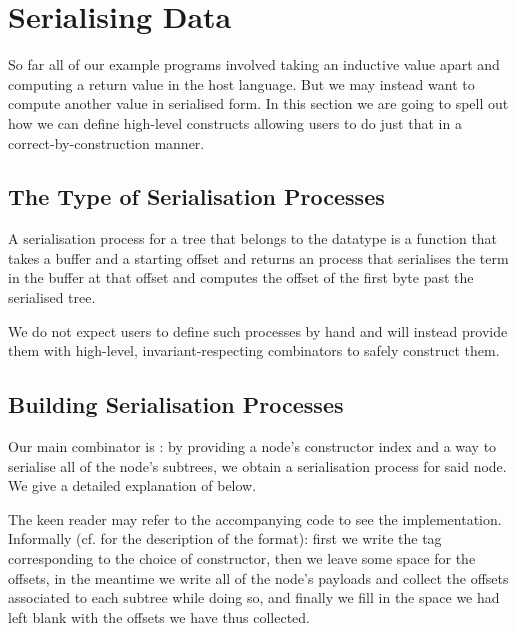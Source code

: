 \section{Serialising Data}\label{sec:serialising}

So far all of our example programs involved taking an inductive value
apart and computing a return value in the host language.
%
But we may instead want to compute another value in serialised form.
%
In this section we are going to spell out how we can define high-level
constructs allowing users to do just that in a correct-by-construction
manner.

\label{fig:serialised-map}


\subsection{The Type of Serialisation Processes}

A serialisation process for a tree  that belongs to the
datatype  is a function that takes a buffer
and a starting offset and returns an  process that
serialises the term in the buffer at that offset and computes the
offset of the first byte past the serialised tree.


We do not expect users to define such processes by hand and will instead
provide them with high-level, invariant-respecting combinators to safely
construct them.

\subsection{Building Serialisation Processes}

Our main combinator is \IdrisFunction{(\#)}: by providing
a node's constructor index
and a way to serialise all of the node's subtrees,
we obtain a serialisation process for said node.
%
We give a detailed explanation of  below.


The keen reader may refer to the accompanying code to see the implementation.
Informally (cf.  for the description of the format):
first we write the tag corresponding to the choice of constructor,
then we leave some space for the offsets,
in the meantime we write all of the node's payloads and collect the offsets
associated to each subtree while doing so,
and finally we fill in the space we had left blank with the offsets
we have thus collected.

